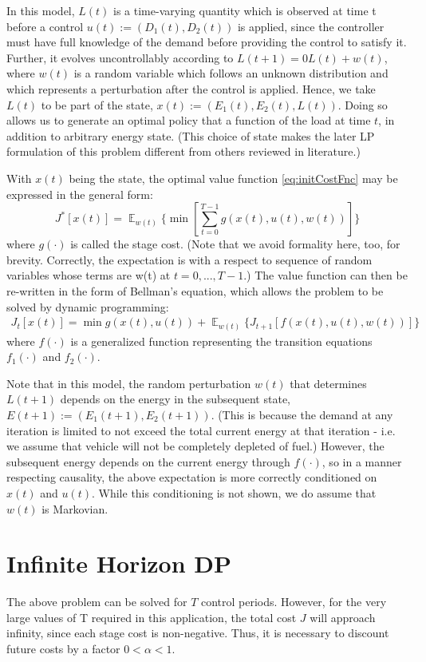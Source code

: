 \documentclass[conference]{IEEEtran}
\DeclareMathOperator{\E}{\mathbb{E}}
\begin{document}
In this model, $L(t)$ is a time-varying quantity which is observed at time t before a control $u(t):=(D_{1}(t),D_{2}(t))$ is applied, since the controller must have full knowledge of the demand before providing the control to satisfy it. Further, it evolves uncontrollably according to $L(t+1)=0L(t)+w(t)$, where $w(t)$ is a random variable which follows an unknown distribution and which represents a perturbation after the control is applied. Hence, we take $L(t)$ to be part of the state, $x(t):=(E_{1}(t),E_{2}(t),L(t))$. Doing so allows us to generate an optimal policy that a function of the load at time $t$, in addition to arbitrary energy state. (This choice of state makes the later LP formulation of this problem different from others reviewed in literature.)

With $x(t)$ being the state, the optimal value function \eqref{eq:initCostFnc} may be expressed in the general form:
\begin{equation}J^{*}[x(t)]=\mathop{\E}_{w(t)} \Biggl\{\min\left[\sum_{t=0}^{T-1}g(x(t),u(t),w(t))\right]\Biggr\}\end{equation}
where $g(\cdot)$ is called the stage cost. (Note that we avoid formality here, too, for brevity. Correctly, the expectation is with a respect to sequence of random variables whose terms are w(t) at $t=0,...,T-1$.) The value function can then be re-written in the form of Bellman's equation, which allows the problem to be solved by dynamic programming:
\begin{multline} \label{eq:FHDP}
J_{t}[x(t)]=\min g(x(t),u(t)) + \mathop{\E}_{w(t)} \{J_{t+1}[f(x(t),u(t),w(t))]\}
\end{multline}
where $f(\cdot)$ is a generalized function representing the transition equations $f_{1}(\cdot)$ and $f_{2}(\cdot)$.

Note that in this model, the random perturbation $w(t)$ that determines $L(t+1)$ depends on the energy in the subsequent state, $E(t+1):=(E_{1}(t+1),E_{2}(t+1))$. (This is because the demand at any iteration is limited to not exceed the total current energy at that iteration - i.e. we assume that vehicle will not be completely depleted of fuel.) However, the subsequent energy depends on the current energy through $f(\cdot)$, so in a manner respecting causality, the above expectation is more correctly conditioned on $x(t)$ and $u(t)$. While this conditioning is not shown, we do assume that $w(t)$ is Markovian.

\section{Infinite Horizon DP}
The above problem can be solved for $T$ control periods. However, for the very large values of T required in this application, the total cost $J$ will approach infinity, since each stage cost is non-negative. Thus, it is necessary to discount future costs by a factor $0<\alpha<1$.
\end{document}
